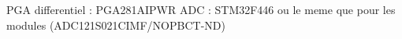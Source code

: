 PGA differentiel : PGA281AIPWR
ADC : STM32F446 ou le meme que pour les modules (ADC121S021CIMF/NOPBCT-ND)